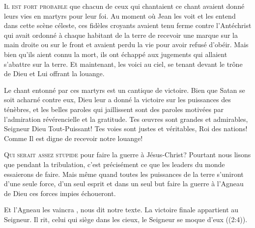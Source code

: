 \lettrine{I}{l est fort probable} que chacun de ceux qui chantaient
 ce chant avaient donné leurs vies en martyrs pour leur foi.
 Au moment où Jean les voit et les entend dans cette scène céleste,
 ces fidèles croyants avaient tenu ferme contre l'Antéchrist
 \ocadr qui avait ordonné à chaque habitant de la terre de recevoir
 une marque sur la main droite ou sur le front \fcadr{}
 et avaient perdu la vie pour avoir refusé d'obéir.
 Mais bien qu'ils aient connu la mort, ils ont échappé aux jugements
 qui allaient s'abattre sur la terre. Et maintenant, les voici au ciel,
 se tenant devant le trône de Dieu et Lui offrant la louange.

Le chant entonné par ces martyrs est un cantique de victoire.
 Bien que Satan se soit acharné contre eux, Dieu leur a donné la victoire
 sur les puissances des ténèbres, et les belles paroles qui jaillissent
 sont des paroles motivées par l'admiration révérencielle et la gratitude.
 \og Tes œuvres sont grandes et admirables, Seigneur Dieu Tout-Puissant!
 Tes voies sont justes et véritables, Roi des nations! \fg{}
 Comme Il est digne de recevoir notre louange!


\dvrule






\lettrine{Q}{ui serait assez stupide} pour faire la guerre à Jésus-Christ?
 Pourtant nous lisons que pendant la tribulation,
 c'est précisément ce que les leaders du monde essaierons de faire.
 Mais même quand toutes les puissances de la terre s'uniront d'une seule force,
 d'un seul esprit et dans un seul but
 \ocadr faire la guerre à l'Agneau de Dieu \fcadr{}
 ces forces impies échoueront.

\og Et l'Agneau les vaincra \fg{}, 
 nous dit notre texte. La victoire finale appartient au Seigneur.
 \og Il rit, celui qui siège dans les cieux, le Seigneur se moque d'eux \fg{}
 ((2:4)).

